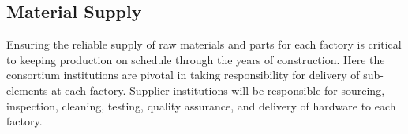 \subsection{Material Supply}  
\label{sec:fdsp-apa-prod-supply}

Ensuring the reliable supply of raw materials and parts for each factory is critical to keeping  production on schedule through the years of construction. Here the consortium institutions are pivotal in taking responsibility for delivery of  sub-elements at each factory. Supplier institutions will be responsible for sourcing, inspection, cleaning, testing, quality assurance, and delivery of hardware to each factory. 

